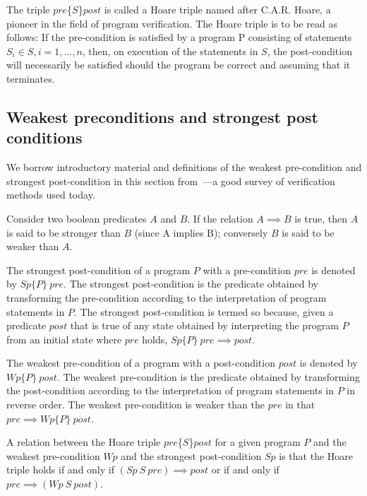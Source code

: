 The triple $pre$\{$S$\}$post$ is called a Hoare triple named after C.A.R. Hoare, a pioneer in the field of program verification. The Hoare triple is to be read as follows: If the pre-condition is satisfied by a program P consisting of statements $S_{i} \in S ,	i=1,...,n$, then, on execution of the statements in $S$, the post-condition will necessarily be satisfied should the program be correct and assuming that it terminates.

\subsection{Weakest preconditions and strongest post conditions}
We borrow introductory material and definitions of the weakest pre-condition and strongest post-condition in this section from~\cite{Gordon10}---a good survey of verification methods used today.

Consider two boolean predicates $A$ and $B$. If the relation $A\implies B$ is true, then $A$ is said to be stronger than $B$ (since A implies B); conversely $B$ is said to be weaker than $A$.

The strongest post-condition of a program $P$ with a pre-condition $pre$ is denoted by $Sp\{P\}\ pre$. The strongest post-condition is the predicate obtained by transforming the pre-condition according to the interpretation of program statements in $P$. The strongest post-condition is termed so because, given a predicate $post$ that is true of any state obtained by interpreting the program $P$ from an initial state where $pre$ holds, $Sp\{P\}\ pre\implies post$.

The weakest pre-condition of a program with a post-condition $post$ is denoted by $Wp\{P\}\ post$. The weakest pre-condition is the predicate obtained by transforming the post-condition according to the interpretation of program statements in $P$ in reverse order. The weakest pre-condition is weaker than the $pre$ in that $pre\implies Wp\{P\}\ post$.

A relation between the Hoare triple $pre$\{$S$\}$post$ for a given program $P$ and the weakest pre-condition $Wp$ and the strongest post-condition $Sp$ is that the Hoare triple holds if and only if $(Sp\ S\ pre)\implies post$ or if and only if $pre\implies (Wp\ S\ post)$.
